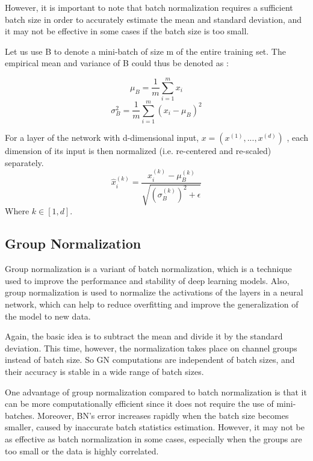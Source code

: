 \documentclass[conference]{IEEEtran}
\begin{document}
However, it is important to note that batch normalization requires a sufficient batch size in order to accurately estimate the mean and standard deviation, and it may not be effective in some cases if the batch size is too small.

Let us use B to denote a mini-batch of size m of the entire training set. The empirical mean and variance of B could thus be denoted as \cite{b8}:

\begin{multicols}{2}
  \begin{equation}
    \mu _{B}={\frac {1}{m}}\sum _{i=1}^{m}x_{i}
  \end{equation}\break
  \begin{equation}
    \sigma _{B}^{2}={\frac {1}{m}}\sum _{i=1}^{m}(x_{i}-\mu _{B})^{2}
  \end{equation}
\end{multicols}

For a layer of the network with d-dimensional input, $x = (x^{(1)},...,x^{(d)})$ , each dimension of its input is then normalized (i.e. re-centered and re-scaled) separately. 
\begin{equation}
 {\hat {x}}_{i}^{(k)}={\frac {x_{i}^{(k)}-\mu _{B}^{(k)}}{\sqrt {\left(\sigma _{B}^{(k)}\right)^{2}+\epsilon }}}
\end{equation}
Where $k \in [1,d]$.

\subsection{Group Normalization}

Group normalization is a variant of batch normalization, which is a technique used to improve the performance and stability of deep learning models. Also, group normalization is used to normalize the activations of the layers in a neural network, which can help to reduce overfitting and improve the generalization of the model to new data. 

Again, the basic idea is to subtract the mean and divide it by the standard deviation. This time, however, the normalization takes place on channel groups instead of batch size. So GN computations are independent of batch sizes, and their accuracy is stable in a wide range of batch sizes.

One advantage of group normalization compared to batch normalization is that it can be more computationally efficient since it does not require the use of mini-batches. Moreover, BN’s error increases rapidly when the batch size becomes smaller, caused by inaccurate batch statistics estimation. However, it may not be as effective as batch normalization in some cases, especially when the groups are too small or the data is highly correlated.
\end{document}
